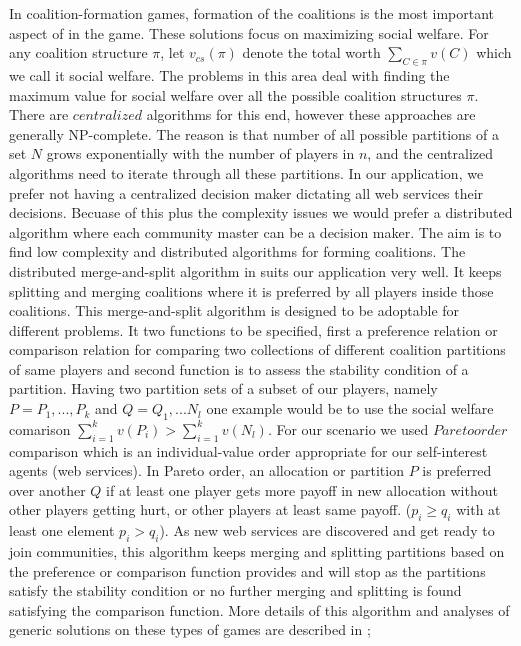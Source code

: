 \documentclass[10pt, conference, compsocconf]{IEEEtran}
\theoremstyle{plain}
\theoremstyle{definition}
\begin{document}
In coalition-formation games, formation of the coalitions is the most important aspect of in the game. These solutions focus on maximizing social welfare. For any coalition structure $\pi$, let $v_{cs}(\pi)$ denote the total worth $\sum_{C \in \pi}{v(C)}$ which we call it social welfare. The problems in this area deal with finding the maximum value for social welfare over all the possible coalition structures $\pi$. There are $centralized$ algorithms for this end, however these approaches are generally NP-complete. The reason is that number of all possible partitions of a set $N$ grows exponentially with the number of players in $n$, and the centralized algorithms need to iterate through all these partitions. 
In our application, we prefer not having a centralized decision maker dictating all web services their decisions. Becuase of this plus the complexity issues we would prefer a distributed algorithm where each community master can be a decision maker. The aim is to find low complexity and distributed algorithms for forming coalitions\cite{DBLP:journals/igtr/AptW09,Dieckmann02dynamiccoalition,ray2007game}. The distributed merge-and-split algorithm in \cite{DBLP:journals/igtr/AptW09} suits our application very well. It keeps splitting and merging coalitions where it is preferred by all players inside those coalitions. 
This merge-and-split algorithm is designed to be adoptable for different problems. It two functions to be specified, first a preference relation or comparison relation for comparing two collections of different coalition partitions of same players and second function is to assess the stability condition of a partition. Having two partition sets of a subset of our players, namely $P = {P_1,...,P_k}$ and $Q = {Q_1,...N_l}$ one example would be to use the social welfare comarison $\sum^k_{i=1}v(P_i) > \sum^k_{i=1}v(N_l)$. For our scenario we used $Pareto order$ comparison which is an individual-value order appropriate for our self-interest agents (web services). In Pareto order, an allocation or partition $P$ is preferred over another $Q$ if at least one player gets more payoff in new allocation without other players getting hurt, or other players at least same payoff. ($p_i \geq q_i$ with at least one element $p_i > q_i$). As new web services are discovered and get ready to join communities, this algorithm keeps merging and splitting partitions based on the preference or comparison function provides and will stop as the partitions satisfy the stability condition or no further merging and splitting is found satisfying the comparison function. More details of this algorithm and analyses of generic solutions on these types of games are described in \cite{DBLP:journals/igtr/AptW09};
\end{document}
